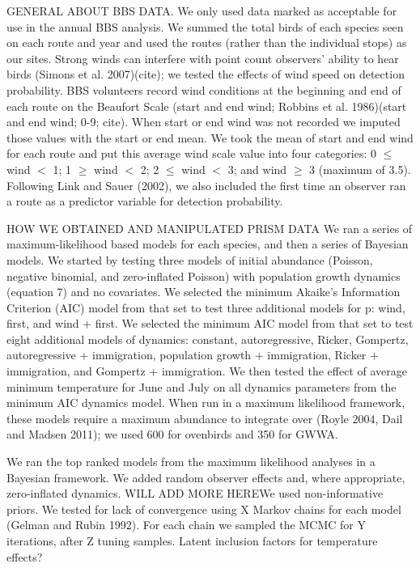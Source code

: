 \documentclass[12pt]{article}
\begin{document}
GENERAL ABOUT BBS DATA.  We only used data marked as acceptable for
use in the annual BBS analysis.  We summed the total birds of each
species seen on each route and year and used the routes (rather than
the individual stops) as our sites.
Strong winds can interfere with point count observers' ability to hear
birds (Simons et al. 2007)(cite); we tested the effects of wind speed
on detection probability.  BBS volunteers record wind conditions at
the beginning and end of each route on the Beaufort Scale (start and
end wind; Robbins et al. 1986)(start and end wind; 0-9; cite).  When
start or end wind was not recorded we imputed those values with the
start or end mean.  We took the mean of start and end wind for each
route and put this average wind scale value into four categories: 0 $\leq$
wind $<$ 1; 1 $\geq$ wind $<$ 2; 2 $\leq$ wind $<$ 3; and wind $\geq$ 3 (maximum of 3.5).
Following Link and Sauer (2002), we also included the first time an
observer ran a route as a predictor variable for detection
probability.

HOW WE OBTAINED AND MANIPULATED PRISM DATA
We ran a series of maximum-likelihood based models for each species,
and then a series of Bayesian models.  We started by testing three
models of initial abundance (Poisson, negative binomial, and
zero-inflated Poisson) with population growth dynamics (equation 7)
and no covariates.  We selected the minimum Akaike's Information
Criterion (AIC) model from that set to test three additional models
for p: wind, first, and wind + first.   We selected the minimum AIC
model from that set to test eight additional models of dynamics:
constant, autoregressive, Ricker, Gompertz, autoregressive +
immigration, population growth + immigration, Ricker + immigration,
and Gompertz + immigration.  We then tested the effect of average
minimum temperature for June and July on all dynamics parameters from
the minimum AIC dynamics model.  When run in a maximum likelihood
framework, these models require a maximum abundance to integrate over
(Royle 2004, Dail and Madsen 2011); we used 600 for ovenbirds and 350
for GWWA.

We ran the top ranked models from the maximum likelihood analyses in a
Bayesian framework.  We added random observer effects and, where
appropriate, zero-inflated dynamics.  WILL ADD MORE HEREWe used
non-informative priors.  We tested for lack of convergence using X
Markov chains for each model (Gelman and Rubin 1992).  For each chain
we sampled the MCMC for Y iterations, after Z tuning samples.  Latent
inclusion factors for temperature effects?
\end{document}
